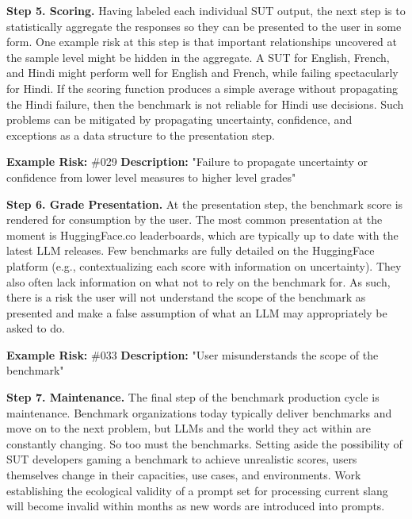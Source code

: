 \documentclass{article}
\begin{document}
{\bf Step 5. Scoring.} Having labeled each individual SUT output, the next step is to statistically aggregate the responses so they can be presented to the user in some form. One example risk at this step is that important relationships uncovered at the sample level might be hidden in the aggregate. A SUT for English, French, and Hindi might perform well for English and French, while failing spectacularly for Hindi. If the scoring function produces a simple average without propagating the Hindi failure, then the benchmark is not reliable for Hindi use decisions. Such problems can be mitigated by propagating uncertainty, confidence, and exceptions as a data structure to the presentation step.

\begin{center}
    \begin{tcolorbox}[colback=gray!10, colframe=black!50, width=\textwidth, boxrule=0.5mm, sharp corners, coltext=black]
        {\bf Example Risk:} \#029
        \newline
        {\bf Description:} "Failure to propagate uncertainty or confidence from lower level measures to higher level grades"
    \end{tcolorbox}
\end{center}

{\bf Step 6. Grade Presentation.} At the presentation step, the benchmark score is rendered for consumption by the user. The most common presentation at the moment is HuggingFace.co leaderboards, which are typically up to date with the latest LLM releases. Few benchmarks are fully detailed on the HuggingFace platform (e.g., contextualizing each score with information on uncertainty). They also often lack information on what not to rely on the benchmark for. As such, there is a risk the user will not understand the scope of the benchmark as presented and make a false assumption of what an LLM may appropriately be asked to do.

\begin{center}
    \begin{tcolorbox}[colback=gray!10, colframe=black!50, width=\textwidth, boxrule=0.5mm, sharp corners, coltext=black]
        {\bf Example Risk:} \#033
        \newline
        {\bf Description:} "User misunderstands the scope of the benchmark"
    \end{tcolorbox}
\end{center}

{\bf Step 7. Maintenance.} The final step of the benchmark production cycle is maintenance. Benchmark organizations today typically deliver benchmarks and move on to the next problem, but LLMs and the world they act within are constantly changing. So too must the benchmarks. Setting aside the possibility of SUT developers gaming a benchmark to achieve unrealistic scores, users themselves change in their capacities, use cases, and environments. Work establishing the ecological validity of a prompt set for processing current slang will become invalid within months as new words are introduced into prompts.
\end{document}
